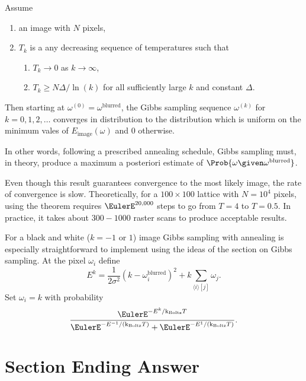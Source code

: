 \documentclass[12pt]{article}
\begin{document}
\begin{theorem}
    Assume
    \begin{enumerate}
        \item
            an image with \( N \) pixels,
        \item
            \( T_k \) is a any decreasing sequence of temperatures such
            that
            \begin{enumerate}
                \item
                    \( T_k \to 0 \) as \( k \to \infty \),
                \item
                    \( T_k \ge N \Delta/\ln(k) \) for all sufficiently
                    large \( k \) and constant \( \Delta \).
            \end{enumerate}
    \end{enumerate}
    Then starting at \( \omega^{(0)} = \omega^{\text{blurred}} \), the
    Gibbs sampling sequence \( \omega^{(k)} \) for \( k=0,1,2, \dots \)
    converges in distribution to the distribution which is uniform on
    the minimum vales of \( E_{\text{image}}(\omega) \) and \( 0 \)
    otherwise.
\end{theorem}

In other words, following a prescribed annealing schedule, Gibbs
sampling must, in theory, produce a maximum a posteriori estimate of \(
\Prob{\omega \given \omega^{\text{blurred}}} \).

Even though this result guarantees convergence to the most likely image,
the rate of convergence is slow.  Theoretically, for a \( 100 \times 100
\) lattice with \( N = 10^4 \) pixels, using the theorem requires \(
\EulerE^{20{,}000} \) steps to go from \( T = 4 \) to \( T = 0.5 \).  In
practice, it takes about \( 300 - 1000 \) raster scans to produce
acceptable results.

For a black and white (\( k = -1 \) or \( 1 \)) image Gibbs sampling
with annealing is especially straightforward to implement using the
ideas of the section on Gibbs sampling.  At the pixel \( \omega_i \)
define
\[
    E^k = \frac{1}{2 \sigma^2}( k - \omega_i^{\text{blurred}})^2 + k
    \sum\limits_{\langle i \rangle[j]} \omega_j.
\] Set \( \omega_i = k \) with probability
\[
    \frac{\EulerE^{-E^k/{\text k}_{\text{Boltz}}T}}{\EulerE^{-E^{-1}/({\text
    k}_{\text{Boltz}}T)} + \EulerE^{-E^1/({\text k}_{\text{Boltz}}T)}}.
\]

\section*{Section Ending Answer}
\end{document}
